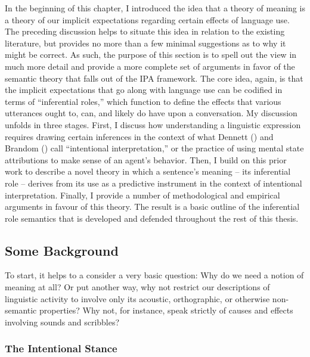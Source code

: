 In the beginning of this chapter, I introduced the idea that a theory of meaning is a theory of our implicit expectations regarding certain effects of language use. The preceding discussion helps to situate this idea in relation to the existing literature, but provides no more than a few minimal suggestions as to why it might be correct. As such, the purpose of this section is to spell out the view in much more detail and provide a more complete set of arguments in favor of the semantic theory that falls out of the IPA framework. The core idea, again, is that the implicit expectations that go along with language use can be codified in terms of ``inferential roles,'' which function to define the effects that various utterances ought to, can, and likely do have upon a conversation. My discussion unfolds in three stages. First, I discuss how understanding a linguistic expression requires drawing certain inferences in the context of what Dennett (\citeyear{Dennett:1991,Dennett:1987}) and Brandom  (\citeyear{Brandom:1994,Brandom:2000,Brandom:2009}) call ``intentional interpretation,'' or the practice of using mental state attributions to make sense of an agent's behavior. Then, I build on this prior work to describe a novel theory in which a sentence's meaning -- its inferential role -- derives from its use as a predictive instrument in the context of intentional interpretation. Finally, I provide a number of methodological and empirical arguments in favour of this theory. The result is a basic outline of the inferential role semantics that is developed and defended throughout the rest of this thesis. 

\subsection{Some Background}

To start, it helps to a consider a very basic question: Why do we need a notion of meaning at all? Or put another way, why not restrict our descriptions of linguistic activity to involve only its acoustic, orthographic, or otherwise non-semantic properties? Why not, for instance, speak strictly of causes and effects involving sounds and scribbles?

\subsubsection{The Intentional Stance}


